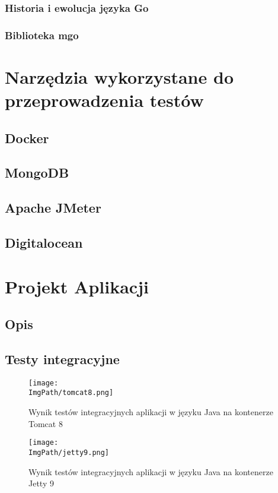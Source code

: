 \documentclass[a4paper,12pt,twoside,openany]{report}
\newcommand{\ImgPath}{img}
\begin{document}
\subsection{Historia i ewolucja języka Go}
\subsection{Biblioteka mgo}

\chapter{Narzędzia wykorzystane do przeprowadzenia testów}
\section{Docker}
\section{MongoDB}
\section{Apache JMeter}
\section{Digitalocean}

\chapter{Projekt Aplikacji}
\section{Opis}
\section{Testy integracyjne}

\begin{figure}
\centering
\hspace*{-3,5cm}
\texttt{[image: \\ImgPath/tomcat8.png]}
\caption{Wynik testów integracyjnych aplikacji w języku Java na kontenerze Tomcat 8}
\label{rlexample}
\end{figure}

\newpage
\begin{figure}
\centering
\hspace*{-3cm}
\texttt{[image: \\ImgPath/jetty9.png]}
\caption{Wynik testów integracyjnych aplikacji w języku Java na kontenerze Jetty 9}
\label{rlexample}
\end{figure}
\end{document}

